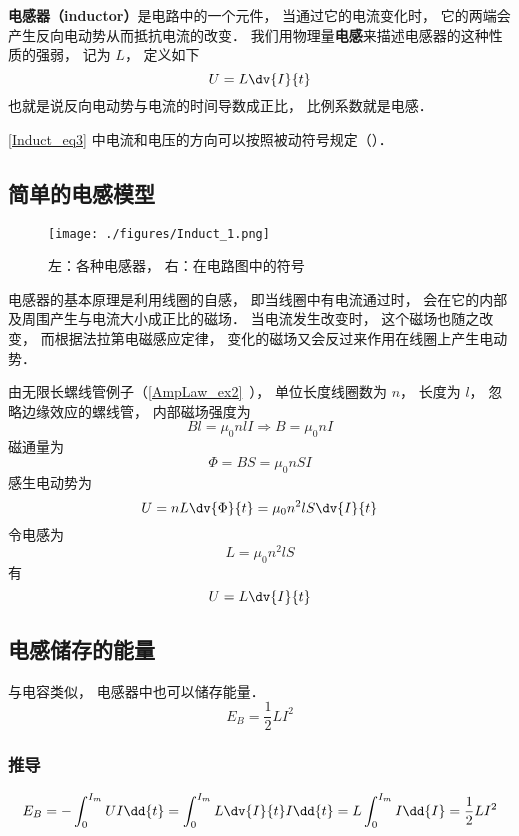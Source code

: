 
\begin{issues}
\issueAbstract
\end{issues}


\textbf{电感器（inductor）}是电路中的一个元件， 当通过它的电流变化时， 它的两端会产生反向电动势从而抵抗电流的改变． 我们用物理量\textbf{电感}来描述电感器的这种性质的强弱， 记为 $L$， 定义如下
\begin{equation}\label{Induct_eq3}
U = L\dv{I}{t}
\end{equation}
也就是说反向电动势与电流的时间导数成正比， 比例系数就是电感．

\autoref{Induct_eq3} 中电流和电压的方向可以按照被动符号规定（）．


\subsection{简单的电感模型}

\begin{figure}[ht]
\centering
\texttt{[image: ./figures/Induct\_1.png]}
\caption{左：各种电感器， 右：在电路图中的符号} \label{Induct_fig1}
\end{figure}
电感器的基本原理是利用线圈的自感， 即当线圈中有电流通过时， 会在它的内部及周围产生与电流大小成正比的磁场． 当电流发生改变时， 这个磁场也随之改变， 而根据法拉第电磁感应定律， 变化的磁场又会反过来作用在线圈上产生电动势．

由无限长螺线管例子（\autoref{AmpLaw_ex2}~）， 单位长度线圈数为 $n$， 长度为 $l$， 忽略边缘效应的螺线管， 内部磁场强度为
\begin{equation}
Bl = \mu_0nlI \Rightarrow B = \mu_0nI
\end{equation}
磁通量为
\begin{equation}
\Phi = BS = \mu_0nSI
\end{equation}
感生电动势为
\begin{equation}
U = nL\dv{\Phi}{t} = \mu_0n^2lS \dv{I}{t}
\end{equation}
令电感为
\begin{equation}\label{Induct_eq1}
L = \mu_0n^2lS
\end{equation}
有
\begin{equation}\label{Induct_eq2}
U = L\dv{I}{t}
\end{equation}

\subsection{电感储存的能量}
与电容类似， 电感器中也可以储存能量．
\begin{equation}
E_B = \frac{1}{2}L I^2
\end{equation}

\subsubsection{推导}
\begin{equation}
E_B = -\int_0^{I_m} U I \dd{t} = \int_0^{I_m} L \dv{I}{t} I \dd{t} = L\int_0^{I_m} I \dd{I} = \frac{1}{2} L I^2
\end{equation}
